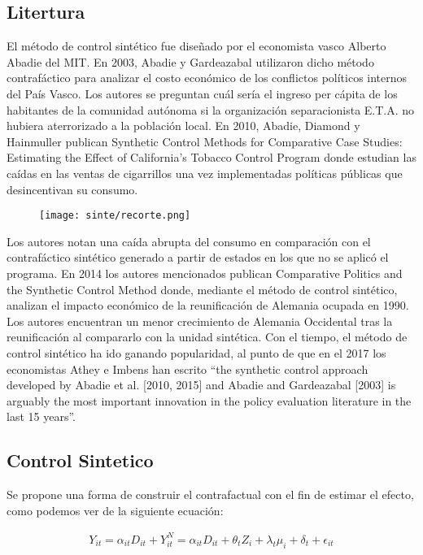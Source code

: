 \documentclass[12pt]{article}
\begin{document}
\subsection{Litertura}


El método de control sintético fue diseñado por el economista vasco Alberto Abadie del MIT. En 2003, Abadie y Gardeazabal utilizaron dicho método contrafáctico para analizar el costo económico de los conflictos políticos internos del País Vasco. Los autores se preguntan cuál sería el ingreso per cápita de los habitantes de la comunidad autónoma si la organización separacionista E.T.A. no hubiera aterrorizado a la población local. En 2010, Abadie, Diamond y Hainmuller publican Synthetic Control Methods for Comparative Case Studies: Estimating the Effect of California’s Tobacco Control Program donde estudian las caídas en las ventas de cigarrillos una vez implementadas políticas públicas que desincentivan su consumo.

\begin{figure}[H]
\centering
\texttt{[image: sinte/recorte.png]}
\end{figure}

Los autores notan una caída abrupta del consumo en comparación con el contrafáctico sintético generado a partir de estados en los que no se aplicó el programa. En 2014 los autores mencionados publican Comparative Politics and the Synthetic Control Method  donde, mediante el método de control sintético, analizan el impacto económico de la reunificación de Alemania ocupada en 1990. Los autores encuentran un menor crecimiento de Alemania Occidental tras la reunificación al compararlo con la unidad sintética. Con el tiempo, el método de control sintético ha ido ganando popularidad, al punto de que en el 2017 los economistas Athey e Imbens han escrito “the synthetic control approach developed by Abadie et al. [2010, 2015] and Abadie and Gardeazabal [2003] is arguably the most important innovation in the policy evaluation literature in the last 15 years”.

\subsection{Control Sintetico}
Se propone una forma de construir el contrafactual con el fin de estimar el efecto, como podemos ver de la siguiente ecuación:

\begin{align*}
    Y_{it} = \alpha_{it}D_{it} + Y^{N}_{it} = \alpha_{it}D_{it} + \theta_{t}Z_{i} + \lambda_{t}\mu_{i} + \delta_{t} + \epsilon_{it}
\end{align*}
\end{document}
